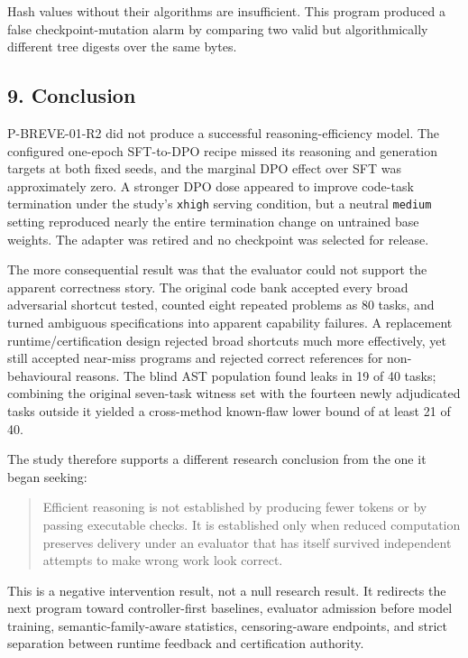 \documentclass[
]{article}
\begin{document}
Hash values without their algorithms are insufficient. This program
produced a false checkpoint-mutation alarm by comparing two valid but
algorithmically different tree digests over the same bytes.

\subsection{9. Conclusion}\label{9-conclusion}

P-BREVE-01-R2 did not produce a successful reasoning-efficiency model.
The configured one-epoch SFT-to-DPO recipe missed its reasoning and
generation targets at both fixed seeds, and the marginal DPO effect over
SFT was approximately zero. A stronger DPO dose appeared to improve
code-task termination under the study's \texttt{xhigh} serving
condition, but a neutral \texttt{medium} setting reproduced nearly the
entire termination change on untrained base weights. The adapter was
retired and no checkpoint was selected for release.

The more consequential result was that the evaluator could not support
the apparent correctness story. The original code bank accepted every
broad adversarial shortcut tested, counted eight repeated problems as 80
tasks, and turned ambiguous specifications into apparent capability
failures. A replacement runtime/certification design rejected broad
shortcuts much more effectively, yet still accepted near-miss programs
and rejected correct references for non-behavioural reasons. The blind
AST population found leaks in 19 of 40 tasks; combining the original
seven-task witness set with the fourteen newly adjudicated tasks outside
it yielded a cross-method known-flaw lower bound of at least 21 of 40.

The study therefore supports a different research conclusion from the
one it began seeking:

\begin{quote}
Efficient reasoning is not established by producing fewer tokens or by
passing executable checks. It is established only when reduced
computation preserves delivery under an evaluator that has itself
survived independent attempts to make wrong work look correct.
\end{quote}

This is a negative intervention result, not a null research result. It
redirects the next program toward controller-first baselines, evaluator
admission before model training, semantic-family-aware statistics,
censoring-aware endpoints, and strict separation between runtime
feedback and certification authority.
\end{document}

